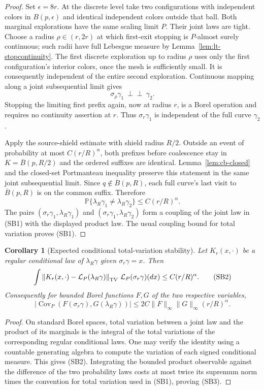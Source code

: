 \documentclass[11pt]{article}
\newtheorem{corollary}[theorem]{Corollary}
\theoremstyle{definition}\newtheorem{definition}[theorem]{Definition}
\theoremstyle{remark}\newtheorem{remark}[theorem]{Remark}
\begin{document}
\begin{proof}
Set $\epsilon=8r$. At the discrete level take two configurations with
independent colors in $B(p,\epsilon)$ and identical independent colors
outside that ball. Both marginal explorations have the same scaling
limit $P$. Their joint laws are tight. Choose a radius
$\rho\in(r,2r)$ at which first-exit stopping is $P$-almost surely
continuous; such radii have full Lebesgue measure by
Lemma~\ref{lem:lt-stopcontinuity}.
The first discrete exploration up to radius $\rho$ uses only the first
configuration's interior colors, once the mesh is sufficiently small.
It is consequently independent of the entire second exploration.
Continuous mapping along a joint subsequential limit gives
\[
 \sigma_\rho\gamma_1\ \perp\!\!\!\perp\ \gamma_2.
\]
Stopping the limiting first prefix again, now at radius $r$, is a Borel
operation and requires no continuity assertion at $r$. Thus
$\sigma_r\gamma_1$ is independent of the full curve $\gamma_2$.

Apply the source-shield estimate with shield radius $R/2$. Outside an
event of probability at most $C(r/R)^\alpha$, both prefixes before
coalescence stay in $K=\overline B(p,R/2)$ and the ordered suffixes
are identical. Lemma~\ref{lem:cb-closed} and the closed-set Portmanteau
inequality preserve this statement in the same joint subsequential
limit. Since $q\notin\overline B(p,R)$, each full curve's last visit
to $\overline B(p,R)$ is on the common suffix. Therefore
\[
 \mathbb P\{\lambda_R\gamma_1\ne\lambda_R\gamma_2\}
 \leq C(r/R)^\alpha.
\]
The pairs
$(\sigma_r\gamma_1,\lambda_R\gamma_1)$ and
$(\sigma_r\gamma_1,\lambda_R\gamma_2)$ form a coupling of the
joint law in (SB1) with the displayed product law. The usual coupling
bound for total variation proves (SB1).
\end{proof}

\begin{corollary}[Expected conditional total-variation stability]
\label{cor:spatial-conditional-tv}
Let $K_r(x,\cdot)$ be a regular conditional law of $\lambda_R\gamma$
given $\sigma_r\gamma=x$. Then
\[
 \int\left\|K_r(x,\cdot)-\mathcal L_P(\lambda_R\gamma)
          \right\|_{\rm TV}
       \,\mathcal L_P(\sigma_r\gamma)(dx)
 \leq C(r/R)^\alpha.
 \tag{SB2}
\]
Consequently for bounded Borel functions $F,G$ of the two respective
variables,
\[
 |\operatorname{Cov}_P(F(\sigma_r\gamma),G(\lambda_R\gamma))|
 \leq 2C\|F\|_\infty\|G\|_\infty(r/R)^\alpha.
 \tag{SB3}
\]
\end{corollary}
\begin{proof}
On standard Borel spaces, total variation between a joint law and the
product of its marginals is the integral of the total variations of
the corresponding regular conditional laws. One may verify the identity
using a countable generating algebra to compute the variation of each
signed conditional measure. This gives (SB2). Integrating the bounded
product observable against the difference of the two probability laws
costs at most twice its supremum norm times the convention for total
variation used in (SB1), proving (SB3).
\end{proof}
\end{document}
